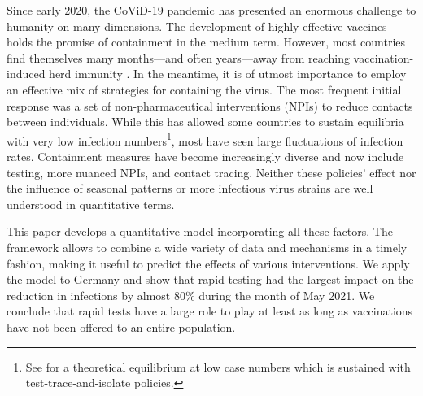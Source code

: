 


Since early 2020, the CoViD-19 pandemic has presented an enormous challenge to humanity
on many dimensions. The development of highly effective vaccines holds the promise of
containment in the medium term. However, most countries find themselves many
months---and often years---away from reaching vaccination-induced herd immunity
\citep{Swaminathan2021}.
In the meantime, it is of utmost importance to employ an effective mix of strategies for
containing the virus. The most frequent initial response was a set of non-pharmaceutical
interventions (NPIs) to reduce contacts between individuals. While this has allowed some
countries to sustain equilibria with very low infection numbers\footnote{See
    \citet{Contreras2021} for a theoretical equilibrium at low case numbers which is
    sustained with test-trace-and-isolate policies.}, most have seen large fluctuations of
infection rates. Containment measures have become increasingly diverse and now include
testing, more nuanced NPIs, and contact tracing. Neither these policies' effect nor the
influence of seasonal patterns or more infectious virus strains are well understood in
quantitative terms.

This paper develops a quantitative model incorporating all these factors. The framework
allows to combine a wide variety of data and mechanisms in a timely fashion, making it
useful to predict the effects of various interventions. We apply the model to Germany
and show that rapid testing had the largest impact on the reduction in infections by
almost 80\% during the month of May 2021. We conclude that rapid tests have a large role
to play at least as long as vaccinations have not been offered to an entire population.

